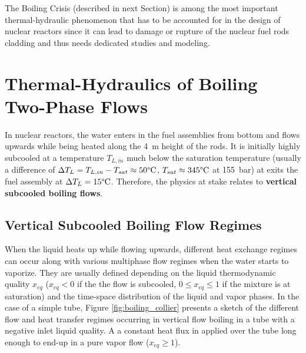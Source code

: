 \npar

The Boiling Crisis (described in next Section) is among the most important thermal-hydraulic phenomenon that has to be accounted for in the design of nuclear reactors since it can lead to damage or rupture of the nuclear fuel rods cladding and thus needs dedicated studies and modeling. %


\section{Thermal-Hydraulics of Boiling Two-Phase Flows}

In nuclear reactors, the water enters in the fuel assemblies from bottom and flows upwards while being heated along the 4~m height of the rods. It is initially highly subcooled \ie at a temperature $T_{L,in}$ much below the saturation temperature (usually a difference of $\Delta T_{L} = T_{L,in}-T_{sat} \approx 50 \degree\mathrm{C}$, $T_{sat} \approx 345\degree\mathrm{C}$ at 155\ bar) at exits the fuel assembly at $\Delta T_{L} = 15\degree\mathrm{C}$. Therefore, the physics at stake relates to \textbf{vertical subcooled boiling flows}.


\subsection{Vertical Subcooled Boiling Flow Regimes}

When the liquid heats up while flowing upwards, different heat exchange regimes can occur along with various multiphase flow regimes when the water starts to vaporize. They are usually defined depending on the liquid thermodynamic quality $x_{eq}$ ($x_{eq}<0$ if the the flow is subcooled, $0 \leq x_{eq} \leq 1$ if the mixture is at saturation) and the time-space distribution of the liquid and vapor phases. In the case of a simple tube, Figure \ref{fig:boiling_collier} presents a sketch of the different flow and heat transfer regimes occurring in vertical flow boiling in a tube with a negative inlet liquid quality. A a constant heat flux in applied over the tube long enough to end-up in a pure vapor flow ($x_{eq} \geq 1$).


